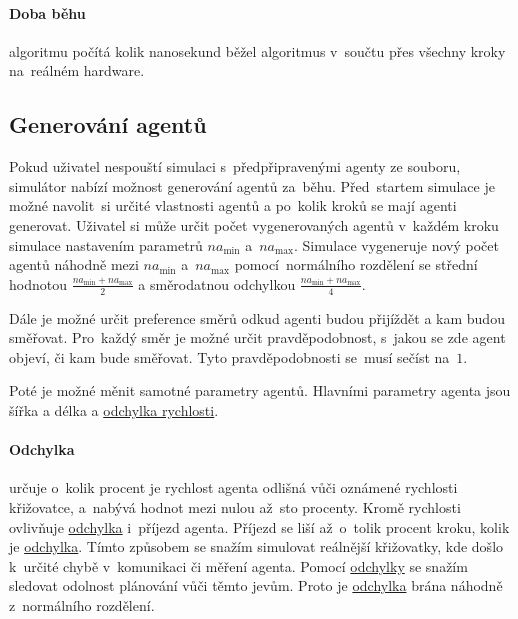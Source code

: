 \paragraph{Doba běhu}\label{par:doba_behu} algoritmu počítá kolik nanosekund běžel algoritmus
v~součtu přes všechny kroky na~reálném hardware.

\subsection{Generování agentů}\label{subsec:generovani_agentu}


Pokud uživatel nespouští simulaci s~předpřipravenými agenty ze souboru,
simulátor nabízí možnost generování agentů za~běhu.
Před~startem simulace je možné navolit~si určité vlastnosti agentů a po~kolik kroků se mají agenti generovat.
Uživatel si může určit počet vygenerovaných agentů v~každém kroku simulace nastavením parametrů $na_{\min}$ a~$na_{\max}$.
Simulace vygeneruje nový počet agentů náhodně mezi $na_{\min}$ a~$na_{\max}$
pomocí~normálního rozdělení se střední hodnotou $\frac{na_{\min} + na_{\max}}{2}$
a směrodatnou odchylkou $\frac{na_{\min} + na_{\max}}{4}$.

Dále je možné určit preference směrů odkud agenti budou přijíždět a kam budou směřovat.
Pro~každý směr je možné určit pravděpodobnost, s~jakou se zde agent objeví, či kam bude směřovat.
Tyto pravděpodobnosti se~musí sečíst na~$1$.

Poté je možné měnit samotné parametry agentů.
Hlavními parametry agenta jsou šířka a délka a \hyperref[par:odchylka]{odchylka rychlosti}.

\paragraph{Odchylka}\label{par:odchylka} určuje o~kolik procent je rychlost agenta odlišná
vůči oznámené rychlosti křižovatce, a~nabývá hodnot mezi nulou až~sto procenty.
Kromě rychlosti ovlivňuje \hyperref[par:odchylka]{odchylka} i~příjezd agenta.
Příjezd se liší až~o~tolik procent kroku, kolik je \hyperref[par:odchylka]{odchylka}.
Tímto způsobem se snažím simulovat reálnější křižovatky, kde došlo k~určité chybě v~komunikaci či měření agenta.
Pomocí \hyperref[par:odchylka]{odchylky} se snažím sledovat odolnost plánování vůči těmto jevům.
Proto je \hyperref[par:odchylka]{odchylka} brána náhodně z~normálního rozdělení.
